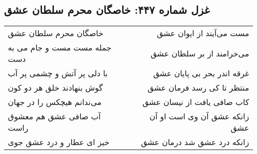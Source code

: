 \begin{center}
\section*{غزل شماره ۴۴۷: خاصگان محرم سلطان عشق}
\label{sec:447}
\begin{longtable}{l p{0.5cm} r}
خاصگان محرم سلطان عشق
&&
مست می‌آیند از ایوان عشق
\\
جمله مست مست و جام می به دست
&&
می‌خرامند از بر سلطان عشق
\\
با دلی پر آتش و چشمی پر آب
&&
غرقه اندر بحر بی پایان عشق
\\
گوش بنهادند خلق هر دو کون
&&
منتظر تا کی رسد فرمان عشق
\\
می‌ندانم هیچکس را در جهان
&&
کاب صافی یافت از نیسان عشق
\\
آب صافی عشق هم معشوق راست
&&
زانکه عشق آن وی است او آن عشق
\\
خیز ای عطار و درد عشق جوی
&&
زانکه درد عشق شد درمان عشق
\\
\end{longtable}
\end{center}
